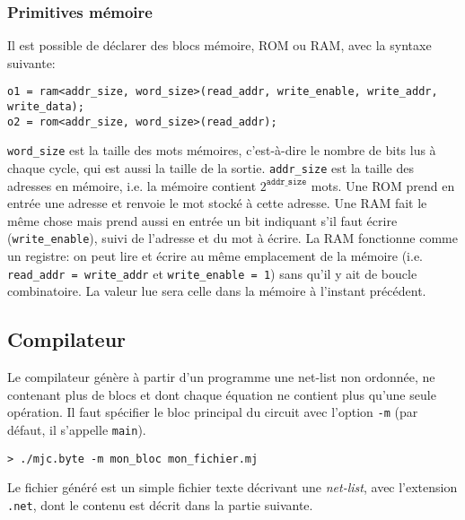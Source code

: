 \documentclass[a4paper]{article}
\begin{document}
\subsubsection*{Primitives mémoire}

Il est possible de déclarer des blocs mémoire, ROM ou RAM, avec la syntaxe suivante:
\begin{lstlisting}
o1 = ram<addr_size, word_size>(read_addr, write_enable, write_addr, write_data);
o2 = rom<addr_size, word_size>(read_addr);
\end{lstlisting}
\lstinline+word_size+ est la taille des mots mémoires, c'est-à-dire le nombre de bits lus à chaque cycle, qui est aussi la taille de la sortie. \lstinline+addr_size+ est la taille des adresses en mémoire, i.e. la mémoire contient $2^{\mathtt{addr\_size}}$ mots. Une ROM prend en entrée une adresse et renvoie le mot stocké à cette adresse. Une RAM fait le même chose mais prend aussi en entrée un bit indiquant s'il faut écrire (\texttt{write\_enable}), suivi de l'adresse et du mot à écrire. La RAM fonctionne comme un registre: on peut lire et écrire au même emplacement de la mémoire (i.e. \lstinline+read_addr = write_addr+ et \lstinline+write_enable = 1+) sans qu'il y ait de boucle combinatoire.  La valeur lue sera celle dans la mémoire à l'instant précédent.


\subsection{Compilateur}

%
%
%

Le compilateur \minijazz{} génère à partir d'un programme une net-list non ordonnée, ne contenant plus de blocs et dont chaque équation ne contient plus qu'une seule opération. Il faut spécifier le bloc principal du circuit avec l'option \texttt{-m} (par défaut, il s'appelle \texttt{main}).
\begin{verbatim}
> ./mjc.byte -m mon_bloc mon_fichier.mj
\end{verbatim}
Le fichier généré est un simple fichier texte décrivant une \emph{net-list}, avec l'extension \texttt{.net}, dont le contenu est décrit dans la partie suivante. 
\end{document}
